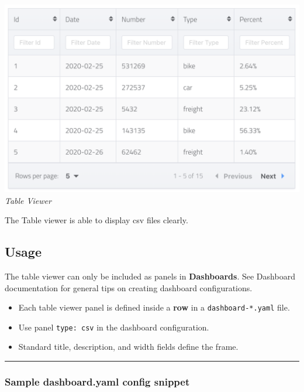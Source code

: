 \includegraphics{assets/table.png} \emph{Table Viewer}

The Table viewer is able to display csv files clearly.

\hypertarget{usage}{%
\subsection{Usage}\label{usage}}

The table viewer can only be included as panels in \textbf{Dashboards}.
See Dashboard documentation for general tips on creating dashboard
configurations.

\begin{itemize}
\tightlist
\item
  Each table viewer panel is defined inside a \textbf{row} in a
  \texttt{dashboard-*.yaml} file.
\item
  Use panel \texttt{type:\ csv} in the dashboard configuration.
\item
  Standard title, description, and width fields define the frame.
\end{itemize}

\begin{center}\rule{0.5\linewidth}{0.5pt}\end{center}

\hypertarget{sample-dashboard.yaml-config-snippet}{%
\subsubsection{Sample dashboard.yaml config
snippet}\label{sample-dashboard.yaml-config-snippet}}


